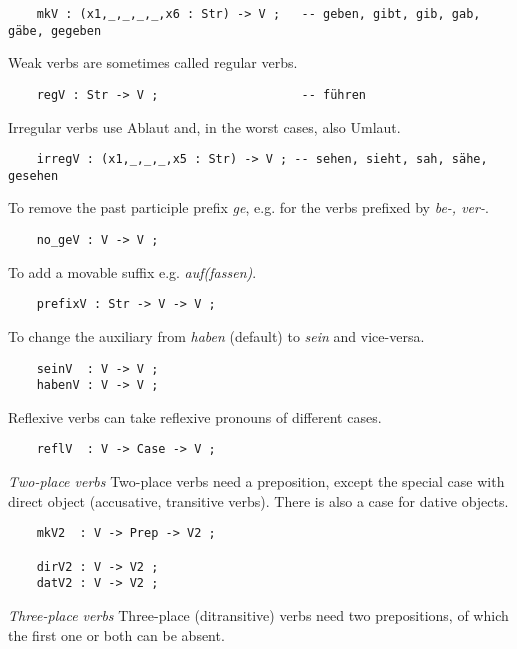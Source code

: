 \documentclass[11pt,a4paper]{article}
\newcommand{\subsubsubsection}[1]{\textit{#1}}
\begin{document}
\begin{verbatim}
    mkV : (x1,_,_,_,_,x6 : Str) -> V ;   -- geben, gibt, gib, gab, gäbe, gegeben
\end{verbatim}

Weak verbs are sometimes called regular verbs.

\begin{verbatim}
    regV : Str -> V ;                    -- führen
\end{verbatim}

Irregular verbs use Ablaut and, in the worst cases, also Umlaut.

\begin{verbatim}
    irregV : (x1,_,_,_,x5 : Str) -> V ; -- sehen, sieht, sah, sähe, gesehen
\end{verbatim}

To remove the past participle prefix \textit{ge}, e.g. for the verbs
prefixed by \textit{be-, ver-}.

\begin{verbatim}
    no_geV : V -> V ;
\end{verbatim}

To add a movable suffix e.g. \textit{auf(fassen)}.

\begin{verbatim}
    prefixV : Str -> V -> V ;
\end{verbatim}

To change the auxiliary from \textit{haben} (default) to \textit{sein} and
vice-versa.

\begin{verbatim}
    seinV  : V -> V ;
    habenV : V -> V ;
\end{verbatim}

Reflexive verbs can take reflexive pronouns of different cases.

\begin{verbatim}
    reflV  : V -> Case -> V ;
\end{verbatim}

\subsubsubsection{Two-place verbs}
Two-place verbs need a preposition, except the special case with direct object
(accusative, transitive verbs). There is also a case for dative objects.

\begin{verbatim}
    mkV2  : V -> Prep -> V2 ;
  
    dirV2 : V -> V2 ;
    datV2 : V -> V2 ;
\end{verbatim}

\subsubsubsection{Three-place verbs}
Three-place (ditransitive) verbs need two prepositions, of which
the first one or both can be absent.
\end{document}
